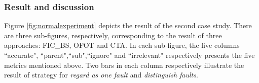 \documentclass{sig-alternate}
\begin{document}

%
%
%
%
%
%
%
%

\subsubsection{Result and discussion}
Figure \ref{fig:normalexperiment} depicts the result of the second case study. There are three sub-figures, respectively, corresponding to the result of three approaches: FIC\_BS, OFOT and CTA. In each sub-figure, the five columns ``accurate", ``parent",``sub",``ignore" and ``irrelevant" respectively presents the five metrics mentioned above. Two bars in each column respectively illustrate the result of strategy for \emph{regard as one fault} and \emph{distinguish faults}.
\end{document}
